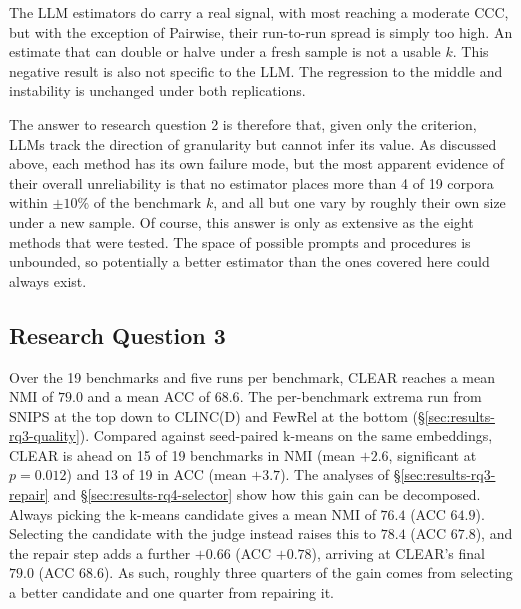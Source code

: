 \documentclass[11pt,a4paper,oneside]{report}
\begin{document}
The LLM estimators do carry a real signal, with most reaching a moderate CCC, but with the exception of Pairwise, their run-to-run spread is simply too high. An estimate that can double or halve
under a fresh sample is not a usable $k$. This negative result is also
not specific to the LLM. The regression to the middle and instability
is unchanged under both replications.

The answer to research question 2 is therefore that, given only the
criterion, LLMs track the direction of granularity but cannot infer its
value. As discussed above, each method has its own failure mode, but the most apparent evidence of their overall unreliability is that no estimator places more than 4 of 19 corpora within $\pm 10\%$ of the benchmark $k$, and all but one vary by roughly their own size under a new sample. Of course, this answer is only as extensive as the eight methods that were tested. The space of possible prompts and procedures is unbounded, so potentially a better estimator than the ones covered here could always exist.


\subsection{Research Question 3}

Over the 19 benchmarks and five runs per benchmark, CLEAR reaches a mean NMI of $79.0$ and a mean ACC of $68.6$. The per-benchmark extrema run from SNIPS at the top down to CLINC(D) and FewRel at the bottom (\S\ref{sec:results-rq3-quality}). Compared against seed-paired k-means on the same embeddings, CLEAR is
ahead on 15 of 19 benchmarks in NMI (mean $+2.6$, significant at $p = 0.012$) and 13 of 19 in ACC
(mean $+3.7$). The analyses of \S\ref{sec:results-rq3-repair} and
\S\ref{sec:results-rq4-selector} show how this gain can be decomposed. Always picking the k-means candidate gives a mean NMI of $76.4$ (ACC
$64.9$). Selecting the candidate with the judge instead raises this to
$78.4$ (ACC $67.8$), and the repair step adds a further $+0.66$ (ACC
$+0.78$), arriving at CLEAR's final $79.0$ (ACC $68.6$). As such, roughly three quarters of the gain comes from selecting a better candidate and one
quarter from repairing it.
\end{document}
